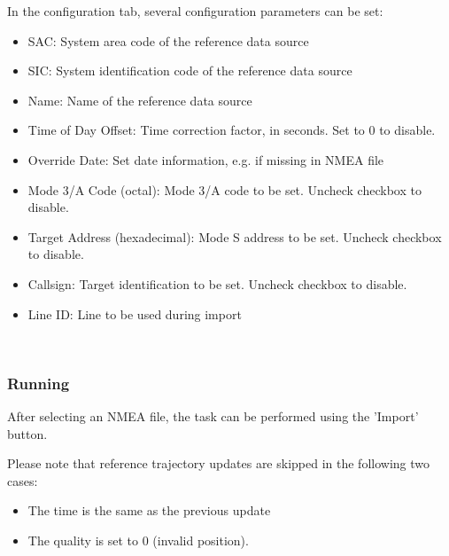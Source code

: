 In the configuration tab, several configuration parameters can be set:

\begin{itemize}
\item SAC: System area code of the reference data source
\item SIC: System identification code of the reference data source
\item Name: Name of the reference data source
\item Time of Day Offset: Time correction factor, in seconds. Set to 0 to disable.
\item Override Date: Set date information, e.g. if missing in NMEA file
\item Mode 3/A Code (octal): Mode 3/A code to be set. Uncheck checkbox to disable.
\item Target Address (hexadecimal): Mode S address to be set. Uncheck checkbox to disable.
\item Callsign: Target identification to be set. Uncheck checkbox to disable.
\item Line ID: Line to be used during import
\end{itemize}
\ \\

\subsubsection{Running}

After selecting an NMEA file, the task can be performed using the 'Import' button.

Please note that reference trajectory updates are skipped in the following two cases:
\begin{itemize}
\item The time is the same as the previous update
\item The quality is set to 0 (invalid position).
\end{itemize}
